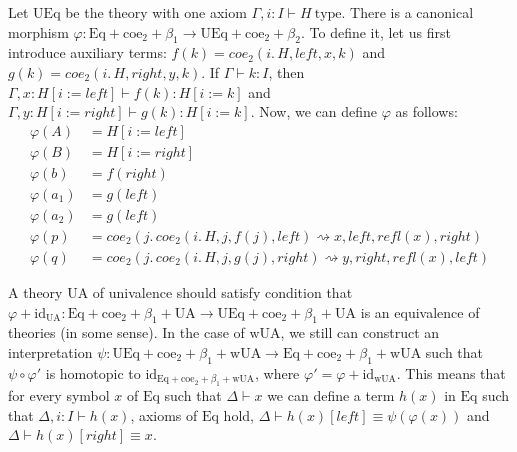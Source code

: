 \documentclass{mscs}
\newcommand{\deq}{\equiv}
\newcommand{\repl}{:=}
\newcommand{\wUA}{\mathrm{wUA}}
\newcommand{\UA}{\mathrm{UA}}
\newcommand{\coeT}{\mathrm{coe}}
\newcommand{\Eq}{\mathrm{Eq}}
\newcommand{\UEq}{\mathrm{UEq}}
\newcommand{\id}{\mathrm{id}}
\newcommand{\refl}{\mathit{refl}}
\newcommand{\leftI}{\mathit{left}}
\newcommand{\rightI}{\mathit{right}}
\newcommand{\coe}{\mathit{coe}}
\newcommand{\idtype}{\rightsquigarrow}
\newcommand{\type}{\mathrm{type}}
\numberwithin{figure}{section}
\begin{document}
Let $\UEq$ be the theory with one axiom $\Gamma, i : I \vdash H\ \type$.
There is a canonical morphism $\varphi : \Eq + \coeT_2 + \beta_1 \to \UEq + \coeT_2 + \beta_2$.
To define it, let us first introduce auxiliary terms: $f(k) = \coe_2(i.\,H, \leftI, x, k)$ and $g(k) = \coe_2(i.\,H, \rightI, y, k)$.
If $\Gamma \vdash k : I$, then $\Gamma, x : H[i \repl \leftI] \vdash f(k) : H[i \repl k]$ and $\Gamma, y : H[i \repl \rightI] \vdash g(k) : H[i \repl k]$.
Now, we can define $\varphi$ as follows:
\begin{align*}
\varphi(A) & = H[i \repl \leftI] \\
\varphi(B) & = H[i \repl \rightI] \\
\varphi(b) & = f(\rightI) \\
\varphi(a_1) & = g(\leftI) \\
\varphi(a_2) & = g(\leftI) \\
\varphi(p) & = \coe_2(j.\,\coe_2(i.\,H, j, f(j), \leftI) \idtype x, \leftI, \refl(x), \rightI) \\
\varphi(q) & = \coe_2(j.\,\coe_2(i.\,H, j, g(j), \rightI) \idtype y, \rightI, \refl(x), \leftI)
\end{align*}

A theory $\UA$ of univalence should satisfy condition that $\varphi + \id_{\UA} : \Eq + \coeT_2 + \beta_1 + \UA \to \UEq + \coeT_2 + \beta_1 + \UA$ is an equivalence of theories (in some sense).
In the case of $\wUA$, we still can construct an interpretation $\psi : \UEq + \coeT_2 + \beta_1 + \wUA \to \Eq + \coeT_2 + \beta_1 + \wUA$ such that $\psi \circ \varphi'$ is homotopic to $\id_{\Eq + \coeT_2 + \beta_1 + \wUA}$, where $\varphi' = \varphi + \id_{\wUA}$.
This means that for every symbol $x$ of $\Eq$ such that $\Delta \vdash x$ we can define a term $h(x)$ in $\Eq$ such that
$\Delta, i : I \vdash h(x)$, axioms of $\Eq$ hold, $\Delta \vdash h(x)[\leftI] \deq \psi(\varphi(x))$ and $\Delta \vdash h(x)[\rightI] \deq x$.
\end{document}
